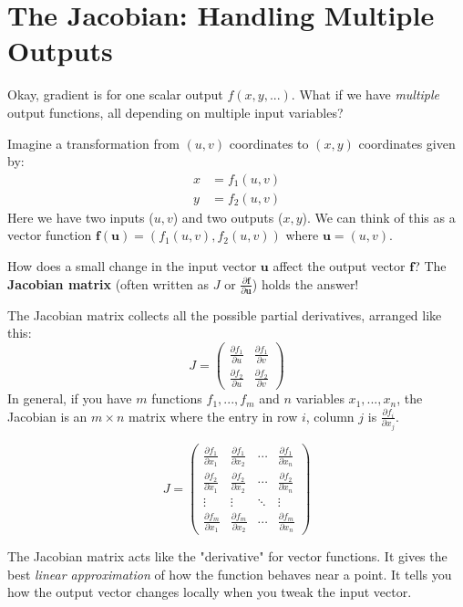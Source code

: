 \documentclass[11pt]{article}
\begin{document}
\section{The Jacobian: Handling Multiple Outputs}

Okay, gradient is for one scalar output $f(x, y, ...)$. What if we have \emph{multiple} output functions, all depending on multiple input variables?

Imagine a transformation from $(u, v)$ coordinates to $(x, y)$ coordinates given by:
\begin{align*} x &= f_1(u, v) \\ y &= f_2(u, v) \end{align*}
Here we have two inputs ($u, v$) and two outputs ($x, y$). We can think of this as a vector function $\mathbf{f}(\mathbf{u}) = (f_1(u, v), f_2(u, v))$ where $\mathbf{u} = (u, v)$.

How does a small change in the input vector $\mathbf{u}$ affect the output vector $\mathbf{f}$? The \textbf{Jacobian matrix} (often written as $J$ or $\frac{\partial \mathbf{f}}{\partial \mathbf{u}}$) holds the answer!

The Jacobian matrix collects all the possible partial derivatives, arranged like this:
$$ J = \begin{pmatrix} \frac{\partial f_1}{\partial u} & \frac{\partial f_1}{\partial v} \\ \frac{\partial f_2}{\partial u} & \frac{\partial f_2}{\partial v} \end{pmatrix} $$
In general, if you have $m$ functions $f_1, ..., f_m$ and $n$ variables $x_1, ..., x_n$, the Jacobian is an $m \times n$ matrix where the entry in row $i$, column $j$ is $\frac{\partial f_i}{\partial x_j}$.

$$ J = \begin{pmatrix}
\frac{\partial f_1}{\partial x_1} & \frac{\partial f_1}{\partial x_2} & \cdots & \frac{\partial f_1}{\partial x_n} \\
\frac{\partial f_2}{\partial x_1} & \frac{\partial f_2}{\partial x_2} & \cdots & \frac{\partial f_2}{\partial x_n} \\
\vdots & \vdots & \ddots & \vdots \\
\frac{\partial f_m}{\partial x_1} & \frac{\partial f_m}{\partial x_2} & \cdots & \frac{\partial f_m}{\partial x_n}
\end{pmatrix} $$

The Jacobian matrix acts like the "derivative" for vector functions. It gives the best \emph{linear approximation} of how the function behaves near a point. It tells you how the output vector changes locally when you tweak the input vector.
\end{document}
